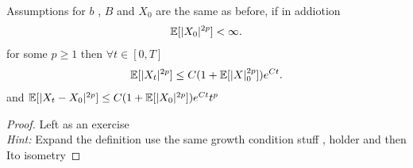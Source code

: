\begin{theorem}
  Assumptions for $b$ , $B$ and $X_{0}$ are the same as before, if in addiotion 
  \begin{align*}
    \mathbb{E}[\lvert X_0\rvert^{2p} ]< \infty
  .\end{align*}
  for some $p \ge 1$ then $\forall  t \in  [0,T]$ 
  \begin{align*}
    \mathbb{E}[\lvert X_t\rvert^{2p}]\le C(1+\mathbb{E}[\lvert X\rvert_0^{2p} ])e^{Ct} 
  .\end{align*}
  and $\mathbb{E}[\lvert X_t - X_0\rvert^{2p} ] \le  C(1+\mathbb{E}[\lvert X_0\rvert^{2p} ])e^{Ct}t^p $
\end{theorem}
\begin{proof}
 Left as an exercise \\
 \textit{Hint:} Expand the definition  use the same growth condition stuff , holder and then Ito isometry 
\end{proof}
\newpage
